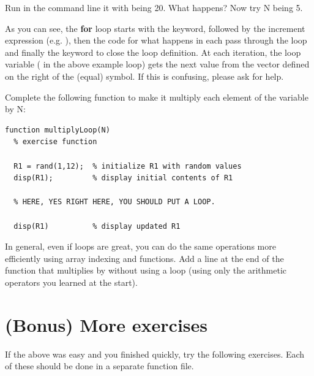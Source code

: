 \documentclass{article}
\begin{document}
Run in the command line it with  being 20. What happens? Now try N being 5.

As you can see, the \textbf{for} loop starts with the  keyword, followed by the increment expression (e.g. ), then the code for what happens in each pass through the loop and finally the  keyword to close the loop definition.
At each iteration, the loop variable ( in the above example loop) gets the next value from the vector defined on the right of the \mcode{=} (equal) symbol. If this is confusing, please ask for help.

Complete the following function to make it multiply each element of the variable  by N:
\begin{lstlisting}
function multiplyLoop(N)
  % exercise function

  R1 = rand(1,12);  % initialize R1 with random values
  disp(R1);         % display initial contents of R1

  % HERE, YES RIGHT HERE, YOU SHOULD PUT A LOOP.

  disp(R1)          % display updated R1
\end{lstlisting}

In general, even if loops are great, you can do the same operations more efficiently using array indexing and functions.
Add a line at the end of the function that multiplies  by  without using a loop (using only the arithmetic operators you learned at the start).


\pagebreak
\section{(Bonus) More exercises}

If the above was easy and you finished quickly, try the following exercises.
Each of these should be done in a separate function file.
\end{document}
